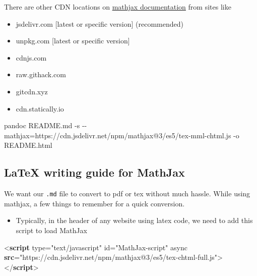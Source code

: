 \documentclass[
]{article}
\newenvironment{Shaded}{}{}
\newcommand{\AttributeTok}[1]{\textcolor[rgb]{0.49,0.56,0.16}{#1}}
\newcommand{\ErrorTok}[1]{\textcolor[rgb]{1.00,0.00,0.00}{\textbf{#1}}}
\newcommand{\ExtensionTok}[1]{#1}
\newcommand{\KeywordTok}[1]{\textcolor[rgb]{0.00,0.44,0.13}{\textbf{#1}}}
\newcommand{\NormalTok}[1]{#1}
\newcommand{\OperatorTok}[1]{\textcolor[rgb]{0.40,0.40,0.40}{#1}}
\newcommand{\OtherTok}[1]{\textcolor[rgb]{0.00,0.44,0.13}{#1}}
\newcommand{\StringTok}[1]{\textcolor[rgb]{0.25,0.44,0.63}{#1}}
\providecommand{\tightlist}{%
  \setlength{\itemsep}{0pt}\setlength{\parskip}{0pt}}
\begin{document}
There are other CDN locations on
\href{https://docs.mathjax.org/en/latest/web/start.html\#cdn-list}{mathjax
documentation} from sites like

\begin{itemize}
\tightlist
\item
  jsdelivr.com {[}latest or specific version{]} (recommended)
\item
  unpkg.com {[}latest or specific version{]}
\item
  cdnjs.com
\item
  raw.githack.com
\item
  gitcdn.xyz
\item
  cdn.statically.io
\end{itemize}

\begin{Shaded}
\begin{Highlighting}[]
\ExtensionTok{pandoc}\NormalTok{ README.md }\AttributeTok{{-}s} \AttributeTok{{-}{-}mathjax}\OperatorTok{=}\NormalTok{https://cdn.jsdelivr.net/npm/mathjax@3/es5/tex{-}mml{-}chtml.js }\AttributeTok{{-}o}\NormalTok{   README.html}
\end{Highlighting}
\end{Shaded}

\hypertarget{latex-writing-guide-for-mathjax}{%
\subsection{LaTeX writing guide for
MathJax}\label{latex-writing-guide-for-mathjax}}

We want our \texttt{.md} file to convert to pdf or tex without much
hassle. While using mathjax, a few things to remember for a quick
conversion.

\begin{itemize}
\tightlist
\item
  Typically, in the header of any website using latex code, we need to
  add this script to load MathJax
\end{itemize}

\begin{Shaded}
\begin{Highlighting}[]
\NormalTok{\textless{}}\KeywordTok{script}\OtherTok{ type=}\StringTok{"text/javascript"}\OtherTok{ id=}\StringTok{"MathJax{-}script"}\OtherTok{ async} \ErrorTok{src}\OtherTok{=}\StringTok{"https://cdn.jsdelivr.net/npm/mathjax@3/es5/tex{-}chtml{-}full.js"}\NormalTok{\textgreater{} \textless{}/}\KeywordTok{script}\NormalTok{\textgreater{}}
\end{Highlighting}
\end{Shaded}
\end{document}
